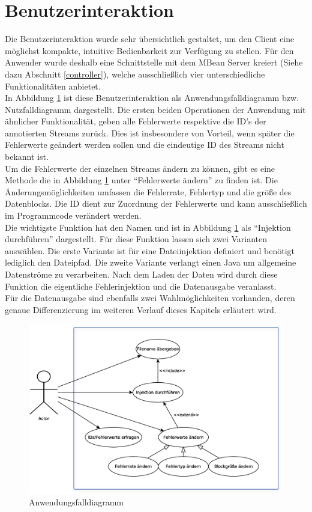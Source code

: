 \section{Benutzerinteraktion}
Die Benutzerinteraktion wurde sehr übersichtlich gestaltet, um den Client eine m\"oglichst kompakte, intuitive Bedienbarkeit zur Verfügung zu stellen. F\"ur den Anwender wurde deshalb eine Schnittstelle mit dem MBean Server kreiert (Siehe dazu Abschnitt \ref{controller}), welche ausschlie\ss lich vier unterschiedliche Funktionalitäten anbietet. \\
In Abbildung \ref{AnFallDia} ist diese Benutzerinteraktion als Anwendungsfalldiagramm bzw. Nutzfalldiagramm dargestellt. Die ersten beiden Operationen der Anwendung mit ähnlicher Funktionalität, geben alle Fehlerwerte respektive die ID's der annotierten Streams zurück. Dies ist insbesondere von Vorteil, wenn später die Fehlerwerte geändert werden sollen und die eindeutige ID des Streams nicht bekannt ist. \\
Um die Fehlerwerte der einzelnen Streams ändern zu können, gibt es eine Methode die in Abbildung \ref{AnFallDia} unter ``Fehlerwerte \"andern'' zu finden ist. Die Änderungsmöglichkeiten umfassen die Fehlerrate, Fehlertyp und die grö\ss e des Datenblocks. Die ID dient zur Zuordnung der Fehlerwerte und kann ausschlie\ss lich im Programmcode ver\"andert werden.\\
Die wichtigste Funktion hat den Namen  und ist in Abbildung \ref{AnFallDia} als ``Injektion durchführen'' dargestellt. Für diese Funktion lassen sich zwei Varianten auswählen. Die erste Variante ist für eine Dateiinjektion definiert und benötigt lediglich den Dateipfad. Die zweite Variante verlangt einen Java  um allgemeine Datenströme zu verarbeiten. Nach dem Laden der Daten wird durch diese Funktion die eigentliche Fehlerinjektion und die Datenausgabe veranlasst.\\
Für die Datenausgabe sind ebenfalls zwei Wahlmöglichkeiten vorhanden, deren genaue Differenzierung im weiteren Verlauf dieses Kapitels erläutert wird.

\begin{figure}[!htb]
\includegraphics[scale=0.55]{graphics/Anwendungsfalldiagramm.eps}
\centering
 \caption[Anwendungsfalldiagramm]{Anwendungsfalldiagramm}
 \label{AnFallDia}
\end{figure}
